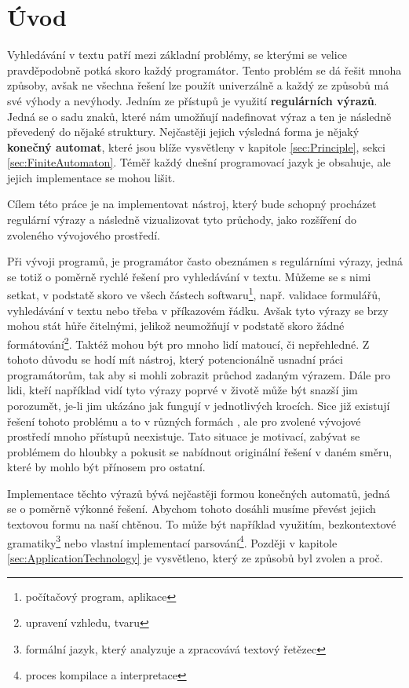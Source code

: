 \chapter{Úvod}\label{sec:Introduction}

Vyhledávání v textu patří mezi základní problémy, se kterými se velice pravděpodobně potká skoro každý programátor. 
Tento problém se dá řešit mnoha způsoby, avšak ne všechna řešení lze použít univerzálně a každý ze způsobů má své výhody a nevýhody.
Jedním ze přístupů je využití \textbf{regulárních výrazů}. 
Jedná se o sadu znaků, které nám umožňují nadefinovat výraz a ten je následně převedený do nějaké struktury. 
Nejčastěji jejich výsledná forma je nějaký \textbf{konečný automat}, které jsou blíže vysvětleny v kapitole \ref{sec:Principle}, sekci \ref{sec:FiniteAutomaton}.
Téměř každý dnešní programovací jazyk je obsahuje, ale jejich implementace se mohou lišit.

Cílem této práce je na implementovat nástroj, který bude schopný procházet regulární výrazy a následně vizualizovat tyto průchody, jako rozšíření do zvoleného vývojového prostředí.

Při vývoji programů, je programátor často obeznámen s regulárními výrazy, jedná se totiž o poměrně rychlé řešení pro vyhledávání v textu. 
Můžeme se s nimi setkat, v podstatě skoro ve všech částech softwaru\footnote{počítačový program, aplikace}, např. validace formulářů, vyhledávání v textu nebo třeba v příkazovém řádku.
Avšak tyto výrazy se brzy mohou stát hůře čitelnými, jelikož neumožňují v podstatě skoro žádné formátování\footnote{upravení vzhledu, tvaru}. 
Taktéž mohou být pro mnoho lidí matoucí, či nepřehledné.
Z tohoto důvodu se hodí mít nástroj, který potencionálně usnadní práci programátorům, tak aby si mohli zobrazit průchod zadaným výrazem.
Dále pro lidi, kteří například vidí tyto výrazy poprvé v životě může být snazší jim porozumět, je-li jim ukázáno jak fungují v jednotlivých krocích.
Sice již existují řešení tohoto problému a to v různých formách \cite{Dib, Regexper, RegExr}, ale pro zvolené vývojové prostředí mnoho přístupů neexistuje.
Tato situace je motivací, zabývat se problémem do hloubky a pokusit se nabídnout originální řešení v daném směru, které by mohlo být přínosem pro ostatní.

Implementace těchto výrazů bývá nejčastěji formou konečných automatů, jedná se o poměrně výkonné řešení. 
Abychom tohoto dosáhli musíme převést jejich textovou formu na naší chtěnou.
To může být například využitím, bezkontextové gramatiky\footnote{formální jazyk, který analyzuje a zpracovává textový řetězec} nebo vlastní implementací parsování\footnote{proces kompilace a interpretace}.
Později v kapitole \ref{sec:ApplicationTechnology} je vysvětleno, který ze způsobů byl zvolen a proč.

